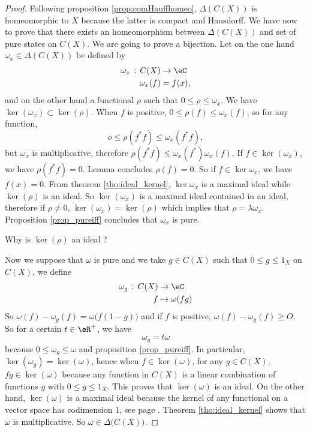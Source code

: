 \begin{proof}
Following proposition \ref{prop:comHauffhomeo}, $\Delta(C(X))$ is homeomorphic to $X$ because the latter is compact and Hausdorff. We have now to prove that there exists an homeomorphism between $\Delta(C(X))$ and set of pure states on $C(X)$. We are going to prove a bijection. Let on the one hand $\omega_x\in\Delta(C(X))$ be defined by
\begin{equation}
\begin{aligned}
 \omega_x\,:\,C(X)&\to \eC \\ 
\omega_x(f)&= f(x),
\end{aligned}
\end{equation}
and on the other hand a functional $\rho$ such that $0\leq\rho\leq\omega_x$. We have $\ker(\omega_x)\subset\ker(\rho)$. When $f$ is positive, $0\leq\rho(f)\leq\omega_x(f)$, so for any function,
\[ 
  o\leq\rho(f^*f)\leq\omega_x(f^*f),
\]
but $\omega_x$ is multiplicative, therefore $\rho(f^*f)\leq\omega_x(f^*)\omega_x(f)$. If $f\in\ker(\omega_x)$, we have $\rho(f^*f)=0$. Lemma concludes $\rho(f)=0$. So if $f\in\ker\omega_x$, we have $f(x)=0$. From theorem \ref{tho:ideal_kernel}, $\ker\omega_x$ is a maximal ideal while $\ker(\rho)$ is an ideal. So $\ker(\omega_x)$ is a maximal ideal contained in an ideal, therefore if $\rho\neq0$, $\ker(\omega_x)=\ker(\rho)$ which implies that $\rho=\lambda\omega_x$. Proposition \ref{prop_pureiff} concludes that $\omega_x$ is pure. 

\begin{probleme}
    Why is $\ker(\rho)$ an ideal ?
\end{probleme}


Now we suppose that $\omega$ is pure and we take  $g\in C(X)$ such that $0\leq g\leq 1_X$ on $C(X)$, we define
\begin{equation}
\begin{aligned}
 \omega_g\,:\,C(X)&\to \eC \\ 
f&\mapsto \omega(fg) 
\end{aligned}
\end{equation}
 So  $\omega(f)-\omega_g(f)=\omega\big( f(1-g) \big)$ and if $f$ is positive, $\omega(f)-\omega_g(f)\geq O$. So for a certain $t\in\eR^+$, we have 
\[ 
  \omega_g=t\omega
\]
 because $0\leq\omega_g\leq\omega$ and proposition \ref{prop_pureiff}. In particular, $\ker (\omega_g)=\ker(\omega)$, hence when $f\in \ker(\omega)$, for any $g\in C(X)$, $fg \in \ker(\omega)$ because any function in $C(X)$ is a linear combination of functions $g$ with $0\leq g\leq 1_X$. This proves that $\ker (\omega)$ is an ideal. On the other hand, $\ker (\omega)$ is a maximal ideal because the kernel of any functional on a vector space has codimension 1, see page \pageref{pg_codimun}. Theorem \ref{tho:ideal_kernel} shows that $\omega$ is multiplicative. So $\omega\in\Delta\big( C(X) \big)$.

\end{proof}

